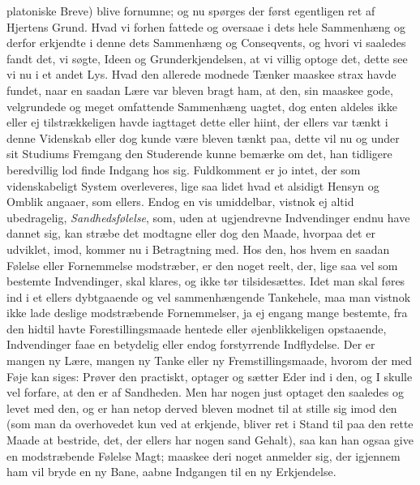 \documentclass[12pt,a4paper]{book}
\newcommand{\apage}[1]{\marginnote{\footnotesize\textit{[#1]}}}
\begin{document}
platoniske Breve) blive fornumne; og nu spørges der først egentligen ret af
Hjertens Grund. Hvad vi forhen fattede og oversaae i dets hele Sammenhæng og
derfor erkjendte i denne dets Sammenhæng og Conseqvents, og hvori vi saaledes
fandt det, vi søgte, Ideen og Grunderkjendelsen, at vi villig optoge det, dette see
vi nu i et andet Lys. Hvad den allerede \apage{187}  modnede Tænker maaskee strax havde fundet,
naar en saadan Lære var bleven bragt ham, at den, sin maaskee gode, velgrundede og
meget omfattende Sammenhæng uagtet, dog enten aldeles ikke eller ej tilstrækkeligen
havde iagttaget dette eller hiint, der ellers var tænkt i denne Videnskab eller dog
kunde være bleven tænkt paa, dette vil nu og under sit Studiums Fremgang den
Studerende kunne bemærke om det, han tidligere beredvillig lod finde Indgang hos
sig. Fuldkomment er jo intet, der som videnskabeligt System overleveres, lige saa
lidet hvad et alsidigt Hensyn og Omblik angaaer, som ellers. Endog en vis
umiddelbar, vistnok ej altid ubedragelig, \emph{Sandhedsfølelse}, som, uden at
ugjendrevne Indvendinger endnu have dannet sig, kan stræbe det modtagne eller dog
den Maade, hvorpaa det er udviklet, imod, kommer nu i Betragtning med. Hos den, hos
hvem en saadan Følelse eller Fornemmelse modstræber, er den noget reelt, der, lige
saa vel som bestemte Indvendinger, skal klares, og ikke tør tilsidesættes. Idet
man skal føres ind i et ellers dybtgaaende og vel sammenhængende Tankehele, maa
man vistnok ikke lade deslige modstræbende Fornemmelser, ja ej engang mange
bestemte, fra den hidtil havte Forestillingsmaade hentede eller øjenblikkeligen
opstaaende, Indvendinger faae en betydelig eller endog forstyrrende Indflydelse.
Der er mangen ny Lære, mangen ny Tanke eller ny \apage{188} Fremstillingsmaade, hvorom der med
Føje kan siges: Prøver den practiskt, optager og sætter Eder ind i den, og I
skulle vel forfare, at den er af Sandheden. Men har nogen just optaget den saaledes
og levet med den, og er han netop derved bleven modnet til at stille sig imod den
(som man da overhovedet kun ved at erkjende, bliver ret i Stand til paa den rette
Maade at bestride, det, der ellers har nogen sand Gehalt), saa kan han ogsaa give
en modstræbende Følelse Magt; maaskee deri noget anmelder sig, der igjennem ham
vil bryde en ny Bane, aabne Indgangen til en ny Erkjendelse.
\end{document}
